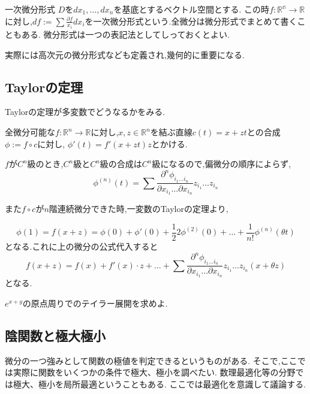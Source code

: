 一次微分形式
$D$を$dx_1 ,\ldots, dx_n$を基底とするベクトル空間とする.
この時$f:\mathbb{R^n} \to \mathbb{R}$に対し,$df := \sum \frac{\partial f}{x_i}dx_i $を一次微分形式という.全微分は微分形式でまとめて書くこともある.
微分形式は一つの表記法としてしっておくとよい.
\begin{rem}
実際には高次元の微分形式なども定義され,幾何的に重要になる.
\end{rem}

\subsection{Taylorの定理}
Taylorの定理が多変数でどうなるかをみる.

全微分可能な$f: \mathbb{R}^n \to \mathbb{R}$に対し,$x, z \in \mathbb{R}^n$を結ぶ直線$c(t) = x + zt$との合成
$\phi := f \circ c$に対し,
$\phi'(t) =   f'(x+zt) z$とかける.

$f$が$C^n$級のとき,$C^n$級と$C^n$級の合成は$C^n$級になるので,偏微分の順序によらず,
\begin{equation*}
\phi^{(n)}(t) = \sum \frac{ \partial^n \phi_{i_1 \ldots i_n}}{ \partial x_{i_1} \ldots \partial x_{i_n}}z_{i_1}\ldots z_{i_n}
\end{equation*}

また$f \circ c$が$n$階連続微分できた時,一変数のTaylorの定理より,

\begin{equation*}
    \phi(1) = f(x+z) = \phi(0) +  \phi'(0) + \frac{1}{2}2\phi^{(2)}(0) + \ldots + \frac{1}{n!}\phi^{(n)}(\theta t)
\end{equation*}
となる.これに上の微分の公式代入すると
\begin{equation*}
    f(x+z) = f(x) + f'(x) \cdot z + \ldots +  \sum \frac{ \partial^n \phi_{i_1 \ldots i_n}}{ \partial x_{i_1} \ldots \partial x_{i_n}}z_{i_1}\ldots z_{i_n}(x+ \theta z)
\end{equation*}
となる.


\begin{exs}
$e^{x+y}$の原点周りでのテイラー展開を求めよ.
\end{exs}


\subsection{陰関数と極大極小}
微分の一つ強みとして関数の極値を判定できるというものがある.
そこで,ここでは実際に関数をいくつかの条件で極大、極小を調べたい.
数理最適化等の分野では極大、極小を局所最適ということもある.
ここでは最適化を意識して議論する.



